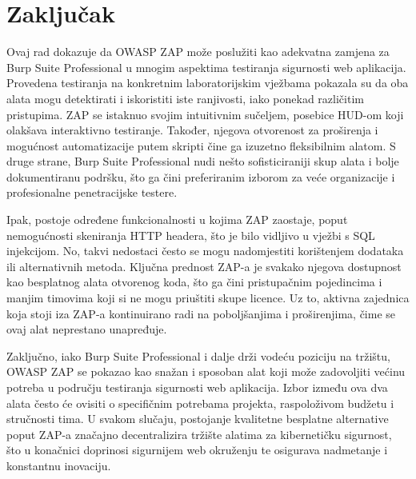 \chapter{Zaključak}
Ovaj rad dokazuje da OWASP ZAP može poslužiti kao adekvatna zamjena za Burp Suite Professional u mnogim aspektima 
testiranja sigurnosti web aplikacija. Provedena testiranja na konkretnim laboratorijskim vježbama pokazala su da oba alata mogu 
detektirati i iskoristiti iste ranjivosti, iako ponekad različitim pristupima.
ZAP se istaknuo svojim intuitivnim sučeljem, posebice HUD-om koji olakšava interaktivno testiranje. 
Također, njegova otvorenost za proširenja i mogućnost automatizacije putem skripti čine ga izuzetno fleksibilnim alatom. 
S druge strane, Burp Suite Professional nudi nešto sofisticiraniji skup alata i bolje dokumentiranu podršku, što ga čini preferiranim 
izborom za veće organizacije i profesionalne penetracijske testere.

Ipak, postoje određene funkcionalnosti u kojima ZAP zaostaje, poput nemogućnosti skeniranja HTTP headera, što je bilo vidljivo u vježbi 
s SQL injekcijom. No, takvi nedostaci često se mogu nadomjestiti korištenjem dodataka ili alternativnih metoda.
Ključna prednost ZAP-a je svakako njegova dostupnost kao besplatnog alata otvorenog koda, što ga čini pristupačnim pojedincima i manjim 
timovima koji si ne mogu priuštiti skupe licence. Uz to, aktivna zajednica koja stoji iza ZAP-a kontinuirano radi na poboljšanjima i  
proširenjima, čime se ovaj alat neprestano unapređuje.

Zaključno, iako Burp Suite Professional i dalje drži vodeću poziciju na tržištu, OWASP ZAP se pokazao kao snažan i sposoban alat koji 
može zadovoljiti većinu potreba u području testiranja sigurnosti web aplikacija. Izbor između ova dva alata često će ovisiti o 
specifičnim potrebama projekta, raspoloživom budžetu i stručnosti tima. U svakom slučaju, postojanje kvalitetne besplatne alternative 
poput ZAP-a značajno decentralizira tržište alatima za kibernetičku sigurnost, što u konačnici doprinosi sigurnijem web okruženju te 
osigurava nadmetanje i konstantnu inovaciju.